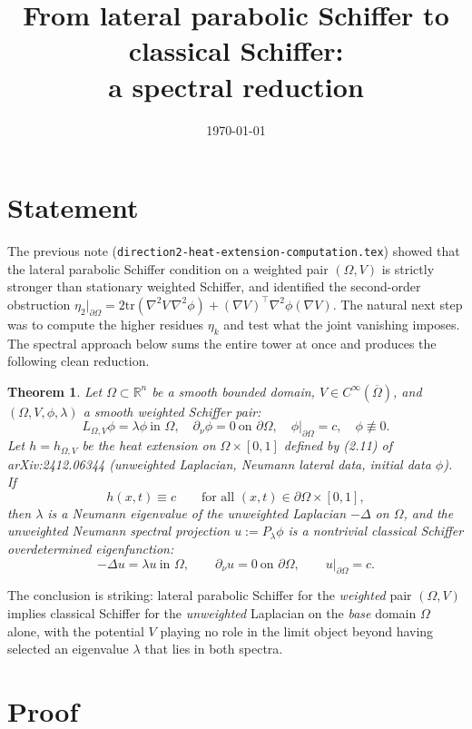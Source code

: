 \documentclass[11pt]{article}
\title{From lateral parabolic Schiffer to classical Schiffer:\\
a spectral reduction}
\author{}
\date{\today}
\newcommand{\R}{\mathbb{R}}
\newcommand{\Om}{\Omega}
\newcommand{\1}{\mathbf 1}
\newcommand{\nor}{\partial_\nu}
\newcommand{\tr}{\mathrm{tr}}
\newtheorem{thm}[lem]{Theorem}
\begin{document}
\maketitle

\section{Statement}

The previous note (\texttt{direction2-heat-extension-computation.tex})
showed that the lateral parabolic Schiffer condition on a weighted
pair $(\Om,V)$ is strictly stronger than stationary weighted Schiffer,
and identified the second-order obstruction
\(
    \eta_2|_{\partial\Om} = 2\tr(\nabla^2V\,\nabla^2\phi)
    +(\nabla V)^\top\nabla^2\phi(\nabla V).
\)
The natural next step was to compute the higher residues $\eta_k$ and
test what the joint vanishing imposes. The spectral approach below
sums the entire tower at once and produces the following clean
reduction.

\begin{thm}\label{thm:main}
Let $\Om\subset\R^n$ be a smooth bounded domain, $V\in C^\infty(\overline\Om)$,
and $(\Om,V,\phi,\lambda)$ a smooth weighted Schiffer pair:
\[
    L_{\Om,V}\phi=\lambda\phi\ \text{in }\Om,\quad
    \nor\phi=0\ \text{on }\partial\Om,\quad
    \phi|_{\partial\Om}=c,\quad \phi\not\equiv 0.
\]
Let $h=h_{\Om,V}$ be the heat extension on $\Om\times[0,1]$ defined by
(2.11) of arXiv:2412.06344 (unweighted Laplacian, Neumann lateral
data, initial data $\phi$). If
\[
    h(x,t)\equiv c\qquad\text{for all }(x,t)\in\partial\Om\times[0,1],
\]
then $\lambda$ is a Neumann eigenvalue of the unweighted Laplacian
$-\Delta$ on $\Om$, and the unweighted Neumann spectral projection
$u:=P_\lambda\phi$ is a nontrivial classical Schiffer overdetermined
eigenfunction:
\[
    -\Delta u=\lambda u\ \text{in }\Om,\qquad
    \nor u=0\ \text{on }\partial\Om,\qquad
    u|_{\partial\Om}=c.
\]
\end{thm}

The conclusion is striking: lateral parabolic Schiffer for the
\emph{weighted} pair $(\Om,V)$ implies classical Schiffer for the
\emph{unweighted} Laplacian on the \emph{base} domain $\Om$ alone,
with the potential $V$ playing no role in the limit object beyond
having selected an eigenvalue $\lambda$ that lies in both spectra.

\section{Proof}
\end{document}
